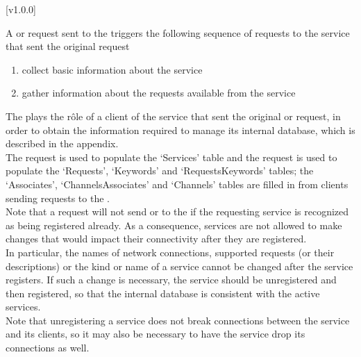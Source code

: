 [v1.0.0]
%

A  or
 request sent to the
 triggers the following sequence of
requests to the service that sent the original request \longDash{}
\begin{enumerate}
\item\textbf{} collect basic information about the
service
\item\textbf{} gather information about the requests
available from the service
\end{enumerate}
The  plays the r\^ole of a client of the
service that sent the original 
or  request, in order to obtain the
information required to manage its internal database, which is described in the
 appendix.\\

The  request is used to populate the `Services' table
and the  request is used to populate the `Requests',
`Keywords' and `RequestsKeywords' tables; the `Associates', `ChannelsAssociates' and
`Channels' tables are filled in from clients sending 
 requests to the
.\\

Note that a  request will not
send  or  to the
 if the requesting service is recognized
as being registered already.
As a consequence, services are not allowed to make changes that would impact their
connectivity after they are registered.\\

In particular, the names of \yarp{} network connections, supported requests (or their
descriptions) or the kind or name of a service cannot be changed after the service
registers.
If such a change is necessary, the service should be unregistered and then registered, so
that the internal database is consistent with the active services.\\

Note that unregistering a service does not break connections between the service and its
clients, so it may also be necessary to have the service drop its connections as well.
\appendixEnd{}
